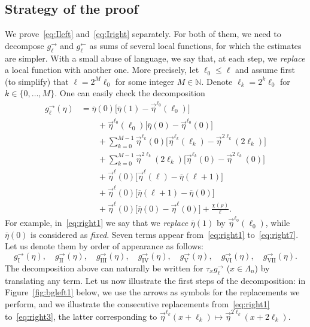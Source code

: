 \documentclass[10pt]{amsart}
\theoremstyle{definition}\newtheorem{defi}[theo]{Definition}\newtheorem{rema}[theo]{Remark}\newtheorem{exam}[theo]{Example}\newtheorem{exem}[theo]{Example}\newtheorem{nota}[theo]{Notation}
\newcommand*{\rmI}{\mathrm{I}}
\newcommand*{\rmII}{\mathrm{II}}
\newcommand*{\rmIII}{\mathrm{III}}
\newcommand*{\rmIV}{\mathrm{IV}}
\newcommand*{\rmV}{\mathrm{V}}
\newcommand*{\rmVI}{\mathrm{VI}}
\newcommand*{\rmVII}{\mathrm{VII}}
\newcommand{\bb}[1]{{\mathbb #1}}
\renewcommand\vec[1]{\overrightarrow{#1}}
\renewcommand{\bar}{\overline}
\renewcommand{\leq}{\leqslant}
\begin{document}
\subsection{Strategy of the proof}
\label{ssec:strategy}

We prove~\eqref{eq:Ileft} and~\eqref{eq:Iright} separately. For both of them, we need to decompose $g^\rightarrow_\ell$ and $g^\leftarrow_\ell$ as sums of several local functions, for which the estimates are simpler. With a small abuse of language, we say that, at each step, we \emph{replace} a local function with another one. More precisely, let $\ell_0 \leq \ell$ and assume first (to simplify) that $\ell= 2^M\ell_0$ for some integer $M\in\bb N$. Denote $\ell_k=2^k\ell_0$ for $k\in\{0,\dots,M\}$. One can easily check the decomposition
\begingroup
\begin{align}
g^\rightarrow_\ell(\eta) &= \bar\eta(0)\Big[\bar\eta(1)-\vec\eta^{\ell_0}(\ell_0)\Big] \label{eq:right1}
\\
&\qquad + \vec\eta^{\ell_0}(\ell_0) \Big[\bar\eta(0)-\vec\eta^{\ell_0}(0)\Big] \label{eq:right2}
\\
&\qquad + \sum_{k=0}^{M-1} \vec\eta^{\ell_k}(0) \Big[\vec\eta^{\ell_k}(\ell_k)-\vec\eta^{2\ell_k}(2\ell_k)\Big] \label{eq:right3}
\\
&\qquad + \sum_{k=0}^{M-1} \vec\eta^{2\ell_k}(2\ell_k) \Big[\vec\eta^{\ell_k}(0)-\vec\eta^{2\ell_k}(0)\Big]\label{eq:right4}
\\
&\qquad + \vec\eta^\ell(0) \Big[\vec\eta^\ell(\ell)-\bar\eta(\ell+1)\Big]\label{eq:right5}
\\
&\qquad + \vec\eta^\ell(0) \Big[\bar\eta(\ell+1)-\bar\eta(0)\Big]\label{eq:right6}
\\
&\qquad + \vec\eta^\ell(0) \Big[\bar\eta(0)-\vec\eta^\ell(0)\Big] + \frac{\chi(\rho)}{\ell}. \label{eq:right7}
\end{align}
\endgroup
For example, in~\eqref{eq:right1} we say that we \emph{replace} $\bar\eta(1)$ by $\vec\eta^{\ell_0}(\ell_0)$, while $\bar\eta(0)$ is considered as \emph{fixed}. Seven terms appear from~\eqref{eq:right1} to~\eqref{eq:right7}. Let us denote them by order of appearance as follows:
\[
g^\rightarrow_{\rmI}(\eta), \quad g^\rightarrow_{\rmII}(\eta),\quad g^\rightarrow_{\rmIII}(\eta),\quad g^\rightarrow_{\rmIV}(\eta), \quad g^\rightarrow_{\rmV}(\eta),\quad g^\rightarrow_{\rmVI}(\eta),\quad g^\rightarrow_{\rmVII}(\eta).
\]
The decomposition above can naturally be written for $\tau_x g^\rightarrow_\ell$ ($x\in\Lambda_n$) by translating any term. Let us now illustrate the first steps of the decomposition: in Figure~\ref{fig:bgleft1} below, we use the arrows as symbols for the replacements we perform, and we illustrate the consecutive replacements from~\eqref{eq:right1} to~\eqref{eq:right3}, the latter corresponding to $\vec\eta^{\ell_k}(x+\ell_k) \mapsto \vec\eta^{2\ell_k}(x+2\ell_k).$
\end{document}
